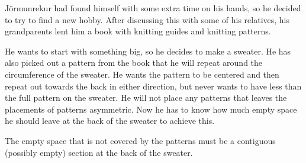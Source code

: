 

Jörmunrekur had found himself with some extra time on his hands, so he
decided to try to find a new hobby. After discussing this with some of
his relatives, his grandparents lent him a book with knitting guides and
knitting patterns.

He wants to start with something big, so he decides to make
a sweater. He has also picked out a pattern from the book that he will 
repeat around the circumference of the sweater.
He wants the pattern to be centered
and then repeat out towards the back in either direction, but never wants to have
less than the full pattern on the sweater. He will not place any patterns that
leaves the placements of patterns asymmetric. Now he has to
know how much empty space he should leave at the back of the sweater to
achieve this.

The empty space that is not covered by the patterns must be a contiguous (possibly empty) 
section at the back of the sweater.

